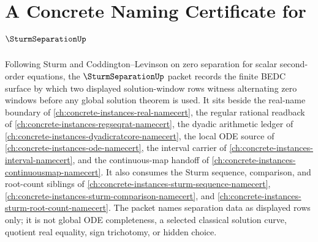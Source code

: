 \chapter{A Concrete Naming Certificate for $\SturmSeparationUp$}
\label{ch:concrete-instances-sturm-separation-namecert}

Following Sturm and Coddington--Levinson on zero separation for scalar second-order equations, the $\SturmSeparationUp$ packet records the finite BEDC surface by which two displayed solution-window rows witness alternating zero windows before any global solution theorem is used. It sits beside the real-name boundary of \autoref{ch:concrete-instances-real-namecert}, the regular rational readback of \autoref{ch:concrete-instances-regseqrat-namecert}, the dyadic arithmetic ledger of \autoref{ch:concrete-instances-dyadicratcore-namecert}, the local ODE source of \autoref{ch:concrete-instances-ode-namecert}, the interval carrier of \autoref{ch:concrete-instances-interval-namecert}, and the continuous-map handoff of \autoref{ch:concrete-instances-continuousmap-namecert}. It also consumes the Sturm sequence, comparison, and root-count siblings of \autoref{ch:concrete-instances-sturm-sequence-namecert}, \autoref{ch:concrete-instances-sturm-comparison-namecert}, and \autoref{ch:concrete-instances-sturm-root-count-namecert}. The packet names separation data as displayed rows only; it is not global ODE completeness, a selected classical solution curve, quotient real equality, sign trichotomy, or hidden choice.

